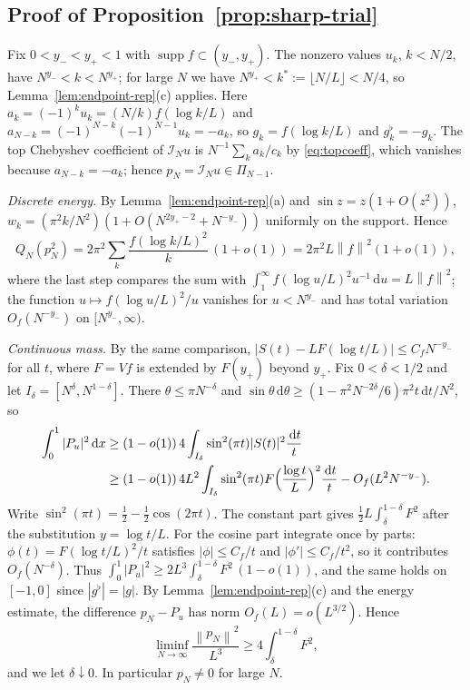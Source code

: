 \documentclass{siamart251216}
\newcommand{\Pn}{\Pi}
\newcommand{\norm}[1]{\left\lVert#1\right\rVert}
\newcommand{\dd}{\,\mathrm d}
\begin{document}
\subsection{\texorpdfstring{Proof of Proposition~\ref{prop:sharp-trial}}{Proof of the trial proposition}}

Fix $0<y_-<y_+<1$ with $\operatorname{supp}f\subset(y_-,y_+)$. The nonzero
values $u_k$, $k<N/2$, have $N^{y_-}<k<N^{y_+}$; for large $N$ we have
$N^{y_+}<k^\ast:=\lfloor N/L\rfloor<N/4$, so Lemma~\ref{lem:endpoint-rep}(c)
applies. Here $a_k=(-1)^ku_k=(N/k)f(\log k/L)$ and
$a_{N-k}=(-1)^{N-k}(-1)^{N-1}u_k=-a_k$, so $g_k=f(\log k/L)$ and
$g^\flat_k=-g_k$. The top Chebyshev
coefficient of $\mathcal I_Nu$ is $N^{-1}\sum_ka_k/c_k$ by \eqref{eq:topcoeff}, which vanishes
because $a_{N-k}=-a_k$; hence $p_N=\mathcal I_Nu\in\Pn_{N-1}$.

\emph{Discrete energy.} By Lemma~\ref{lem:endpoint-rep}(a) and
$\sin z=z(1+O(z^2))$, $w_k=(\pi^2k/N^2)(1+O(N^{2y_+-2}+N^{-y_-}))$ uniformly on
the support. Hence
\[
 Q_N(p_N^2)=2\pi^2\sum_{k}\frac{f(\log k/L)^2}k\,(1+o(1))
 =2\pi^2L\norm f^2(1+o(1)),
\]
where the last step compares the sum with
$\int_1^\infty f(\log u/L)^2u^{-1}\dd u=L\norm f^2$; the function
$u\mapsto f(\log u/L)^2/u$ vanishes for $u<N^{y_-}$ and has total variation
$O_f(N^{-y_-})$ on $[N^{y_-},\infty)$.

\emph{Continuous mass.} By the same comparison,
$|S(t)-LF(\log t/L)|\le C_fN^{-y_-}$ for all $t$, where $F=Vf$ is extended by
$F(y_+)$ beyond $y_+$. Fix $0<\delta<1/2$ and let
$I_\delta=[N^\delta,N^{1-\delta}]$. There $\theta\le\pi N^{-\delta}$ and
$\sin\theta\dd\theta\ge(1-\pi^2N^{-2\delta}/6)\pi^2t\dd t/N^2$, so
\begin{align*}
 \int_0^1|P_u|^2\dd x&\ge(1-o(1))\,4\int_{I_\delta}\sin^2(\pi t)|S(t)|^2\frac{\dd t}t\\
 &\ge(1-o(1))\,4L^2\int_{I_\delta}\sin^2(\pi t)F\Bigl(\frac{\log t}L\Bigr)^2\frac{\dd t}t-O_f(L^2N^{-y_-}).
\end{align*}
Write $\sin^2(\pi t)=\tfrac12-\tfrac12\cos(2\pi t)$. The constant part gives
$\tfrac12L\int_\delta^{1-\delta}F^2$ after the substitution $y=\log t/L$. For the cosine part
integrate once by parts: $\phi(t)=F(\log t/L)^2/t$ satisfies
$|\phi|\le C_f/t$ and $|\phi'|\le C_f/t^2$, so it contributes $O_f(N^{-\delta})$.
Thus $\int_0^1|P_u|^2\ge2L^3\int_\delta^{1-\delta}F^2\,(1-o(1))$, and the
same holds on $[-1,0]$ since $|g^\flat|=|g|$. By
Lemma~\ref{lem:endpoint-rep}(c) and the energy estimate,
the difference $p_N-P_u$ has norm $O_f(L)=o(L^{3/2})$. Hence
\[
 \liminf_{N\to\infty}\frac{\norm{p_N}^2}{L^3}\ge4\int_\delta^{1-\delta}F^2 ,
\]
and we let $\delta\downarrow0$.
In particular $p_N\ne0$ for large $N$.
\end{document}
